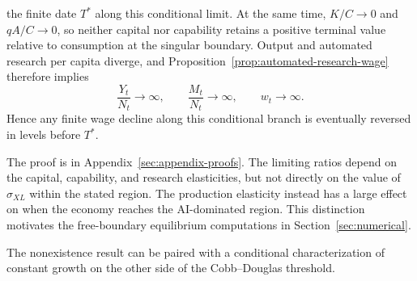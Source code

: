 \begin{conditionalresult}
the finite date $T^*$ along this conditional limit. At the same time,
$K/C\to0$ and $qA/C\to0$, so neither capital nor capability retains a positive
terminal value relative to consumption at the singular boundary. Output and
automated research per capita diverge, and Proposition~\ref{prop:automated-research-wage}
therefore implies
\begin{equation}
    \frac{Y_t}{N_t}\longrightarrow\infty,
    \qquad
    \frac{M_t}{N_t}\longrightarrow\infty,
    \qquad
    w_t\longrightarrow\infty.
    \label{eq:singular-wage-divergence}
\end{equation}
Hence any finite wage decline along this conditional branch is eventually reversed
in levels before $T^*$.
\end{conditionalresult}

The proof is in Appendix~\ref{sec:appendix-proofs}. The limiting ratios depend on
the capital, capability, and research elasticities, but not directly on the value
of $\sigma_{XL}$ within the stated region. The production elasticity instead has
a large effect on when the economy reaches the AI-dominated region. This distinction
motivates the free-boundary equilibrium computations in Section~\ref{sec:numerical}.

The nonexistence result can be paired with a conditional characterization of
constant growth on the other side of the Cobb--Douglas threshold.

